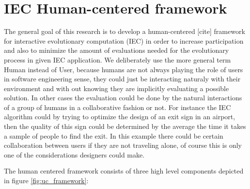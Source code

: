 \documentclass[conference]{IEEEtran}
\begin{document}
 \section{IEC Human-centered framework}
\label{sec:graph}
The general goal of this research is to develop a human-centered [cite] framework
for interactive evolutionary computation (IEC) in order to increase
participation and also to minimize the amount of evaluations needed for the
evolutionary process in given IEC application. We deliberately use the 
more general
term Human instead of User, because humans are not always playing the role of
users in software engineering sense, they could just be interacting 
naturaly with their environment and with out knowing they are implicitly
evaluating a possible solution. In other cases the evaluation could be done
by the natural interactions of a group of humans in a collaborative fashion
or not. For instance the IEC algorithm could by trying to optimize 
the design of an exit sign in an airport, then the quality of this sign could be
determined by the average the time it takes a sample of people to 
find the exit. In this example there could be certain collaboration
between users if they are not traveling alone, of course this is only one of
the considerations designers could make. 
 

The human centered framework consists of three high level components depicted
in figure \ref{fig:uc_framework}:
\end{document}
